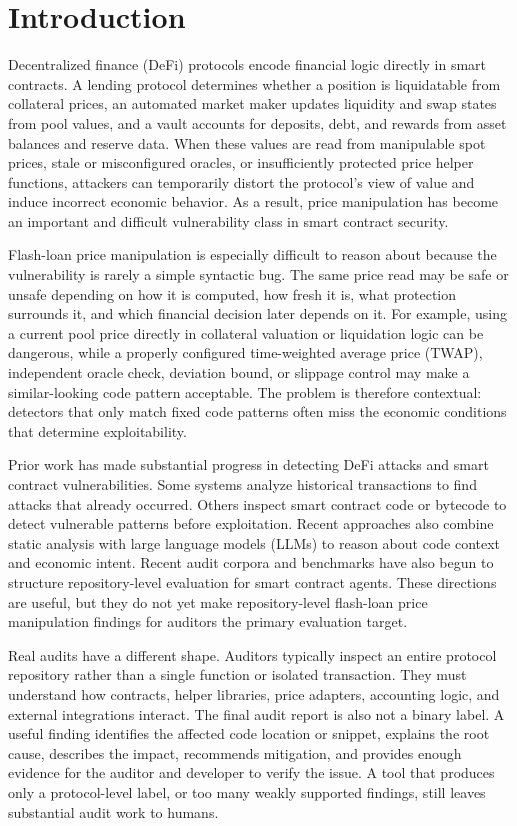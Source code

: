
\chapter{Introduction}

Decentralized finance (DeFi) protocols encode financial logic directly in smart
contracts. A lending protocol determines whether a position is liquidatable from
collateral prices, an automated market maker updates liquidity and swap states
from pool values, and a vault accounts for deposits, debt, and rewards from
asset balances and reserve data. When these values are read from manipulable
spot prices, stale or misconfigured oracles, or insufficiently protected price
helper functions, attackers can temporarily distort the protocol's view of value
and induce incorrect economic behavior. As a result, price manipulation has
become an important and difficult vulnerability class in smart contract
security.

Flash-loan price manipulation is especially difficult to reason about because
the vulnerability is rarely a simple syntactic bug. The same price read may be
safe or unsafe depending on how it is computed, how fresh it is, what protection
surrounds it, and which financial decision later depends on it. For example,
using a current pool price directly in collateral valuation or liquidation logic
can be dangerous, while a properly configured time-weighted average price
(TWAP), independent oracle check, deviation bound, or slippage control may make
a similar-looking code pattern acceptable. The problem is therefore contextual:
detectors that only match fixed code patterns often miss the economic
conditions that determine exploitability.

Prior work has made substantial progress in detecting DeFi attacks and smart
contract vulnerabilities. Some systems analyze historical transactions to find
attacks that already occurred. Others inspect smart contract code or bytecode to
detect vulnerable patterns before exploitation. Recent approaches also combine
static analysis with large language models (LLMs) to reason about code context
and economic intent. Recent audit corpora and benchmarks have also begun to
structure repository-level evaluation for smart contract agents. These
directions are useful, but they do not yet make repository-level flash-loan
price manipulation findings for auditors the primary evaluation target.

Real audits have a different shape. Auditors typically inspect an entire
protocol repository rather than a single function or isolated transaction. They
must understand how contracts, helper libraries, price adapters, accounting
logic, and external integrations interact. The final audit report is also not a
binary label. A useful finding identifies the affected code location or snippet,
explains the root cause, describes the impact, recommends mitigation, and
provides enough evidence for the auditor and developer to verify the issue. A
tool that produces only a protocol-level label, or too many weakly supported
findings, still leaves substantial audit work to humans.

